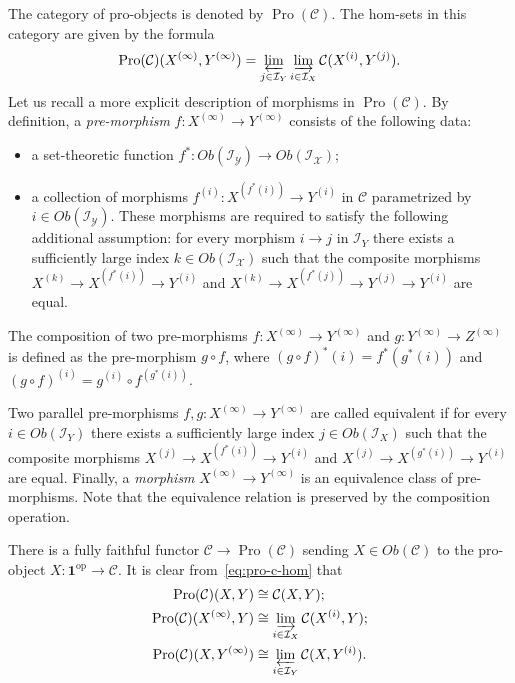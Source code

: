 \documentclass{article}
\numberwithin{equation}{section}
\theoremstyle{definition}
\theoremstyle{remark}
\DeclareMathOperator{\Pro}{Pro}
\newcommand{\op}{\mathrm{op}}
\begin{document}
The category of pro-objects is denoted by \(\Pro(\mathcal C)\). The hom-sets in this category are given by the formula
\begin{equation} \label{eq:pro-c-hom} \Pro(\mathcal C)(X^{(\infty)}, Y^{(\infty)}) = \varprojlim_{j \in \mathcal I_Y} \varinjlim_{i \in \mathcal I_X} \mathcal C(X^{(i)}, Y^{(j)}). \end{equation}
Let us recall a more explicit description of morphisms in \(\Pro(\mathcal C)\). 
By definition, a {\it pre-morphism} \(f \colon X^{(\infty)} \to Y^{(\infty)}\) consists of the following data:
\begin{itemize}
\item a set-theoretic function \(f^* \colon Ob(\mathcal{I_Y}) \to Ob(\mathcal{I_X})\);
\item a collection of morphisms \(f^{(i)} \colon X^{(f^*(i))} \to Y^{(i)}\) in $\mathcal{C}$ parametrized by $i \in Ob(\mathcal{I_Y})$. These morphisms are required to satisfy the following additional assumption: for every morphism \(i \to j\) in \(\mathcal I_Y\) there exists a sufficiently large index \(k \in Ob(\mathcal{I_X})\) such that the composite morphisms \(X^{(k)} \to X^{(f^*(i))} \to Y^{(i)}\) and \(X^{(k)} \to X^{(f^*(j))} \to Y^{(j)} \to Y^{(i)}\) are equal. \end{itemize}
The composition of two pre-morphisms \(f \colon X^{(\infty)} \to Y^{(\infty)}\) and \(g \colon Y^{(\infty)} \to Z^{(\infty)}\) is defined as the pre-morphism \(g \circ f\), where \((g \circ f)^*(i) = f^*(g^*(i))\) and \((g \circ f)^{(i)} = g^{(i)} \circ f^{(g^*(i))}\).

Two parallel pre-morphisms \(f, g \colon X^{(\infty)} \to Y^{(\infty)}\) are called equivalent if for every \(i \in Ob(\mathcal I_Y)\) there exists a sufficiently large index \(j \in Ob(\mathcal I_X)\) such that the composite morphisms \(X^{(j)} \to X^{(f^*(i))} \to Y^{(i)}\) and \(X^{(j)} \to X^{(g^*(i))} \to Y^{(i)}\) are equal. Finally, a {\it morphism} \(X^{(\infty)} \to Y^{(\infty)}\) is an equivalence class of pre-morphisms. Note that the equivalence relation is preserved by the composition operation.

There is a fully faithful functor $\mathcal{C} \to \Pro(\mathcal{C})$ sending \(X \in Ob(\mathcal C)\) to the pro-object $X \colon \mathbf{1}^\op \to \mathcal{C}$. It is clear from~\eqref{eq:pro-c-hom}  that
\begin{align}
 \Pro(\mathcal C)(X, Y) &\cong \mathcal C(X, Y);\\
 \Pro(\mathcal C)(X^{(\infty)}, Y) &\cong \varinjlim_{i \in \mathcal I_X} \mathcal C(X^{(i)}, Y); \label{eq:pro-c-hom-2}\\
 \Pro(\mathcal C)(X, Y^{(\infty)}) &\cong \varprojlim_{i \in \mathcal I_Y} \mathcal C(X, Y^{(i)}).
\end{align}
\end{document}
